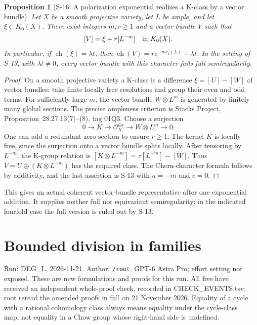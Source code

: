 \documentclass[11pt,a4paper]{article}
\newtheorem{proposition}[theorem]{Proposition}
\theoremstyle{definition}
\begin{document}
\begin{proposition}[S-16: A polarization exponential realizes a K-class by a vector bundle]
\label{prop:semireg-kclass-bundle-realization}
Let $X$ be a smooth projective variety, let $L$ be ample, and let
$\xi\in K_0(X)$. There exist integers $m,r\geq1$ and a vector
bundle $V$ such that
\[
 [V]=\xi+r[L^{-m}]\quad\hbox{in }K_0(X).
\]
In particular, if $\operatorname{ch}(\xi)=\lambda t$, then
$\operatorname{ch}(V)=r e^{-m c_1(L)}+\lambda t$.
In the setting of S-13, with $\lambda t\ne0$, every vector bundle
with this character fails full semiregularity.
\end{proposition}
\begin{proof}
On a smooth projective variety a K-class is a difference
$\xi=[U]-[W]$ of vector bundles: take finite locally free
resolutions and group their even and odd terms.
For sufficiently large $m$, the vector bundle $W\otimes L^m$
is generated by finitely many global sections.
The precise ampleness criterion is Stacks Project,
Proposition~28.27.13(7)--(8), tag 01Q3.
Choose a surjection
\[
 0\longrightarrow K\longrightarrow\mathcal O_X^{\oplus r}
   \longrightarrow W\otimes L^m\longrightarrow0 .
\]
One can add a redundant zero section to ensure $r\geq1$.
The kernel $K$ is locally free, since the surjection onto a
vector bundle splits locally. After tensoring by $L^{-m}$,
the K-group relation is
$[K\otimes L^{-m}]=r[L^{-m}]-[W]$.
Thus $V=U\oplus(K\otimes L^{-m})$ has the required class.
The Chern-character formula follows by additivity, and the
last assertion is S-13 with $a=-m$ and $c=0$.
\end{proof}

This gives an actual coherent vector-bundle representative
after one exponential addition. It supplies neither full nor
equivariant semiregularity; in the indicated fourfold case the
full version is ruled out by S-13.

\section{Bounded division in families}

Run: DEG\_L, 2026-11-21. Author: \texttt{/root}, GPT-6 Astra Pro; effort
setting not exposed. These are new formulations and proofs for this run.
All five have received an independent whole-proof check, recorded in
CHECK\_EVENTS.tsv; root reread the amended proofs in full on 21 November
2026. Equality of a cycle with a rational cohomology class always means
equality under the cycle-class map, not equality in a Chow group whose
right-hand side is undefined.
\end{document}
